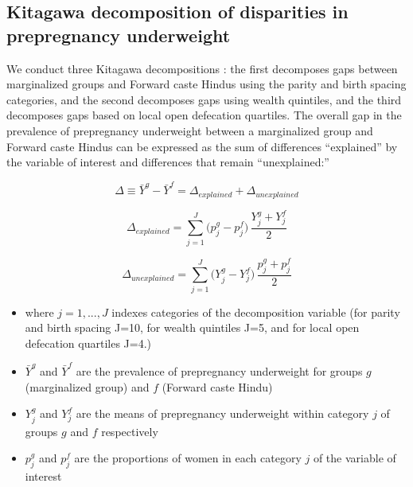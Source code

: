 \documentclass[12pt]{article}
\begin{document}
\subsection{Kitagawa decomposition of disparities in prepregnancy underweight}

We conduct three Kitagawa decompositions \citep{kitagawa1955components}: the first decomposes gaps between marginalized groups and Forward caste Hindus using the parity and birth spacing categories, and the second decomposes gaps using wealth quintiles, and the third decomposes gaps based on local open defecation quartiles. The overall gap in the prevalence of prepregnancy underweight between a marginalized group and Forward caste Hindus can be expressed as the sum of differences ``explained'' by the variable of interest and differences that remain ``unexplained:''

\begin{equation}
\label{eq:kitagawa}
\Delta \equiv \bar Y^{g} - \bar Y^{f}
= \Delta_{explained} + \Delta_{unexplained}
\end{equation}

\begin{equation} \label{eq_explained}
    \Delta_{explained} = \sum_{j=1}^{J} \big(p_j^{g} - p_j^{f}\big)\,\frac{Y_j^{g} + Y_j^{f}}{2}
\end{equation}

\begin{equation} \label{eq_unexplained}
    \Delta_{unexplained} = \sum_{j=1}^{J} \big(Y_j^{g} - Y_j^{f}\big)\,\frac{p_j^{g} + p_j^{f}}{2}
\end{equation}

\begin{itemize}
    \item where \(j=1,...,J\) indexes categories of the decomposition variable (for parity and birth spacing J=10, for wealth quintiles J=5, and for local open defecation quartiles J=4.)
    \item \( \bar Y^g\) and \(\bar Y^f\) are the prevalence of prepregnancy underweight for groups \(g\) (marginalized group) and \(f\) (Forward caste Hindu)
    \item \(Y_j^g\) and \(Y_j^f\) are the means of prepregnancy underweight within category \(j\) of groups \(g\) and \(f\) respectively
    \item \(p_j^g\) and \(p_j^f\) are the proportions of women in each category \(j\) of the variable of interest
    
\end{itemize}
\end{document}
